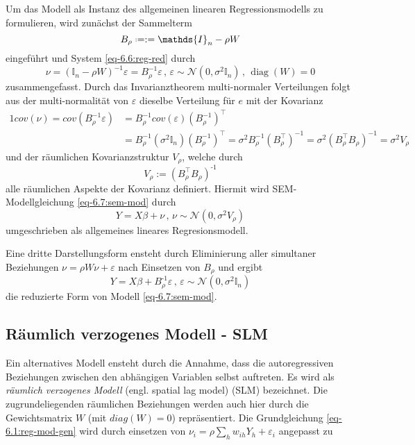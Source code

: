 Um das Modell als Instanz des allgemeinen linearen Regressionsmodells zu formulieren,
wird zunächst der Sammelterm
\begin{equation}
    B_{\rho} \defeq := \mathds{I}_{n} - \rho W
\end{equation}
eingeführt und System \eqref{eq-6.6:reg-red} durch
\begin{equation}
    \nu=(\mathds{I}_{n} -\rho W)^{-1} \varepsilon=B_{\rho}^{-1} \varepsilon \, , \, 
    \varepsilon \sim \mathcal{N}(0,\sigma^{2} \mathds{I}_{n}) \, , \, \operatorname{diag}(W)=0    
\end{equation}
zusammengefasst.
Durch das Invarianztheorem multi-normaler Verteilungen folgt aus der 
multi-normalität von $\varepsilon$ dieselbe Verteilung für $e$ mit der Kovarianz
\begin{alignat*}{1}
    cov(\nu)=cov(B_{\rho}^{-1} \varepsilon) 
    & = B_{\rho}^{-1} cov(\varepsilon) (B_{\rho}^{-1})^{\intercal} \\
    & = B_{\rho}^{-1} (\sigma^{2} \mathds{I}_{n}) (B_{\rho}^{-1})^{\intercal}=
    \sigma^{2} B_{\rho}^{-1} (B_{\rho}^{\intercal})^{-1}=
    \sigma^{2} (B_{\rho}^{\intercal} B_{\rho})^{-1} =\sigma^{2} V_{\rho}
\end{alignat*}
und der räumlichen Kovarianzstruktur $V_{\rho}$, welche durch
\begin{equation}
    V_{\rho} := (B_{\rho}^{\intercal} B_{\rho})^{\text{-1}}
\end{equation}
alle räumlichen Aspekte der Kovarianz definiert. Hiermit wird 
SEM-Modellgleichung \eqref{eq-6.7:sem-mod} durch 
\begin{equation} \label{eq-6.8:sem-mod2}
    Y=X \beta + \nu \, , \, 
    \nu \sim \mathcal{N}(0,\sigma^{2} {V}_{\rho})
\end{equation}
umgeschrieben als allgemeines lineares Regresionsmodell.

Eine dritte Darstellungsform ensteht durch Eliminierung 
aller simultaner Beziehungen $\nu=\rho W \nu + \varepsilon$ 
nach Einsetzen von $B_{\rho}$ und ergibt 
\begin{equation}
    Y=X \beta + B_{\rho}^{\text{-1}} \varepsilon \, , \, 
    \varepsilon \sim \mathcal{N}(0,\sigma^{2} \mathds{I}_{n})
\end{equation}
die reduzierte Form von Modell \eqref{eq-6.7:sem-mod}. 


\subsection{Räumlich verzogenes Modell - SLM}
Ein alternatives Modell ensteht durch die Annahme, 
dass die autoregressiven Beziehungen zwischen den abhängigen Variablen 
selbst auftreten. Es wird als \emph{räumlich verzogenes Modell} 
(engl. spatial lag model) (SLM) bezeichnet. Die zugrundeliegenden räumlichen Beziehungen werden auch hier 
durch die Gewichtsmatrix $W$ (mit $diag(W)=0$) repräsentiert. Die Grundgleichung \eqref{eq-6.1:reg-mod-gen}
wird durch einsetzen von $\nu_{i}=\rho \sum_{h} w_{ih}Y_{h}+\varepsilon_{i}$ angepasst zu 

